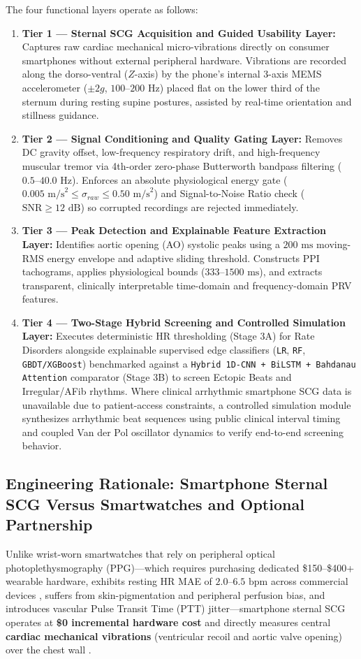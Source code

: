 The four functional layers operate as follows:
\begin{enumerate}
	\item \textbf{Tier 1 --- Sternal SCG Acquisition and Guided Usability Layer:} Captures raw cardiac mechanical micro-vibrations directly on consumer smartphones without external peripheral hardware. Vibrations are recorded along the dorso-ventral ($Z$-axis) by the phone's internal 3-axis MEMS accelerometer ($\pm 2g$, $100\text{--}200\text{ Hz}$) placed flat on the lower third of the sternum during resting supine postures, assisted by real-time orientation and stillness guidance.
	\item \textbf{Tier 2 --- Signal Conditioning and Quality Gating Layer:} Removes DC gravity offset, low-frequency respiratory drift, and high-frequency muscular tremor via 4th-order zero-phase Butterworth bandpass filtering ($0.5\text{--}40.0\text{ Hz}$). Enforces an absolute physiological energy gate ($0.005\text{ m/s}^2 \le \sigma_{raw} \le 0.50\text{ m/s}^2$) and Signal-to-Noise Ratio check ($\text{SNR} \ge 12\text{ dB}$) so corrupted recordings are rejected immediately.
	\item \textbf{Tier 3 --- Peak Detection and Explainable Feature Extraction Layer:} Identifies aortic opening (AO) systolic peaks using a $200\text{ ms}$ moving-RMS energy envelope and adaptive sliding threshold. Constructs PPI tachograms, applies physiological bounds ($333\text{--}1500\text{ ms}$), and extracts transparent, clinically interpretable time-domain and frequency-domain PRV features.
	\item \textbf{Tier 4 --- Two-Stage Hybrid Screening and Controlled Simulation Layer:} Executes deterministic HR thresholding (Stage 3A) for Rate Disorders alongside explainable supervised edge classifiers (\texttt{LR}, \texttt{RF}, \texttt{GBDT/XGBoost}) benchmarked against a \texttt{Hybrid 1D-CNN + BiLSTM + Bahdanau Attention} comparator (Stage 3B) to screen Ectopic Beats and Irregular/AFib rhythms. Where clinical arrhythmic smartphone SCG data is unavailable due to patient-access constraints, a controlled simulation module synthesizes arrhythmic beat sequences using public clinical interval timing and coupled Van der Pol oscillator dynamics to verify end-to-end screening behavior.
\end{enumerate}

\subsection{Engineering Rationale: Smartphone Sternal SCG Versus Smartwatches and Optional Partnership}
Unlike wrist-worn smartwatches that rely on peripheral optical photoplethysmography (PPG)---which requires purchasing dedicated \$150--\$400+ wearable hardware, exhibits resting HR MAE of $2.0\text{--}6.5\text{ bpm}$ across commercial devices \cite{bent2020investigating, nelson2019accuracy}, suffers from skin-pigmentation and peripheral perfusion bias, and introduces vascular Pulse Transit Time (PTT) jitter---smartphone sternal SCG operates at \textbf{\$0 incremental hardware cost} and directly measures central \textbf{cardiac mechanical vibrations} (ventricular recoil and aortic valve opening) over the chest wall \cite{inan2015ballistocardiography}.

